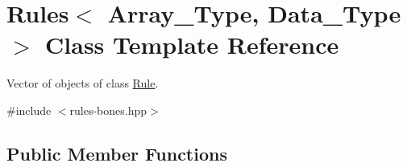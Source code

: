 \hypertarget{class_rules}{}\section{Rules$<$ Array\+\_\+\+Type, Data\+\_\+\+Type $>$ Class Template Reference}
\label{class_rules}


Vector of objects of class \hyperlink{class_rule}{Rule}.  




{\ttfamily \#include $<$rules-\/bones.\+hpp$>$}

\subsection*{Public Member Functions}
